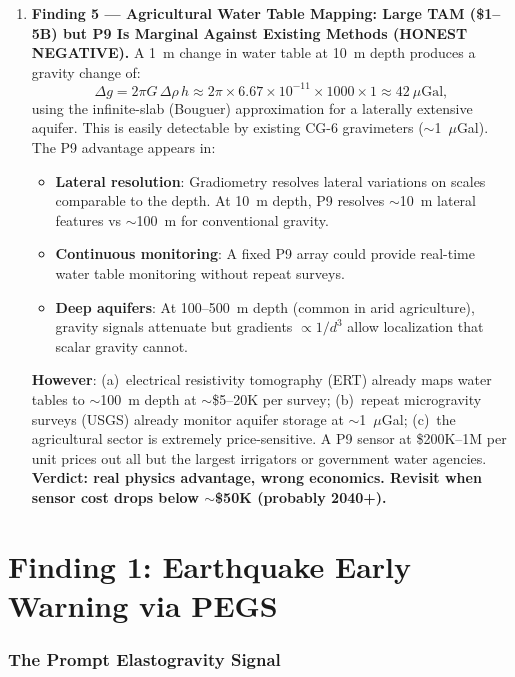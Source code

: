 \documentclass[11pt]{article}
\theoremstyle{definition}
\theoremstyle{remark}
\newcommand{\ee}[1]{\times10^{#1}}
\begin{document}
\begin{enumerate}
\item \textbf{Finding 5 --- Agricultural Water Table Mapping: Large
  TAM (\$1--5B) but P9 Is Marginal Against Existing Methods
  (HONEST NEGATIVE).} A 1~m change in water table at 10~m depth
  produces a gravity change of:
  \begin{equation}
    \Delta g = 2\pi G \, \Delta\rho \, h
    \approx 2\pi \times 6.67\ee{-11} \times 1000 \times 1
    \approx 42~\mu\text{Gal},
  \end{equation}
  using the infinite-slab (Bouguer) approximation for a laterally
  extensive aquifer. This is easily detectable by existing CG-6
  gravimeters ($\sim$1~$\mu$Gal). The P9 advantage appears in:
  \begin{itemize}
    \item \textbf{Lateral resolution}: Gradiometry resolves lateral
      variations on scales comparable to the depth. At 10~m depth,
      P9 resolves $\sim$10~m lateral features vs $\sim$100~m for
      conventional gravity.
    \item \textbf{Continuous monitoring}: A fixed P9 array could
      provide real-time water table monitoring without repeat surveys.
    \item \textbf{Deep aquifers}: At 100--500~m depth (common in
      arid agriculture), gravity signals attenuate but gradients
      $\propto 1/d^3$ allow localization that scalar gravity cannot.
  \end{itemize}
  \textbf{However}: (a)~electrical resistivity tomography (ERT) already
  maps water tables to $\sim$100~m depth at $\sim$\$5--20K per survey;
  (b)~repeat microgravity surveys (USGS) already monitor aquifer
  storage at $\sim$1~$\mu$Gal; (c)~the agricultural sector is
  extremely price-sensitive. A P9 sensor at \$200K--1M per unit
  prices out all but the largest irrigators or government water
  agencies. \textbf{Verdict: real physics advantage, wrong economics.
  Revisit when sensor cost drops below $\sim$\$50K (probably 2040+).}
\end{enumerate}

\part{Finding 1: Earthquake Early Warning via PEGS}
\label{part:earthquake}

\section{The Prompt Elastogravity Signal}
\label{sec:pegs-physics}
\end{document}
